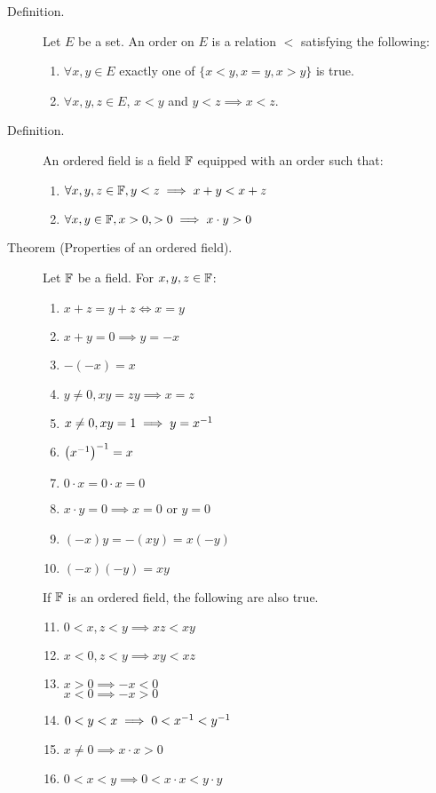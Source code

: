 \documentclass[letterpaper,11pt]{article}
\begin{document}
\begin{description}
\item[Definition.] Let $E$ be a set. An order on $E$ is a relation
    $<$ satisfying the following:
    \begin{enumerate}[(1)]
    \item $\forall x,y\in E$ exactly one of $\{x<y,x=y,x>y\}$ is true.
    \item $\forall x,y,z\in E$, $x<y$ and $y<z \implies x<z$.
    \end{enumerate}

\item[Definition.] An ordered field is a field $\mathbb{F}$ equipped with an
    order such that:
    \begin{enumerate}[(1)]
    \item $\forall x,y,z\in\mathbb{F}, y<z\implies x+y<x+z$
    \item $\forall x,y\in\mathbb{F}, x>0,>0\implies x\cdot y>0$
    \end{enumerate}

\item[Theorem (Properties of an ordered field).] Let $\mathbb{F}$ be a field.
    For $x,y,z\in\mathbb{F}$:
    \begin{multicols}{2}
    \begin{enumerate}[(F1)]
    \item $x+z=y+z\iff x=y$
    \item $x+y=0\implies y=-x$
    \item $-(-x)=x$
    \item $y\ne0,xy=zy\implies x=z$
    \item $x\ne0,xy=1\implies y={x^{-1}}$
    \item ${\left({x^{-1}}\right)^{-1}}=x$
    \item $0\cdot x=0\cdot x=0$
    \item $x\cdot y=0\implies x=0$ or $y=0$
    \item $(-x)y=-(xy)=x(-y)$
    \item $(-x)(-y)=xy$
    \end{enumerate}
    \end{multicols}
    If $\mathbb{F}$ is an ordered field, the following are also true.
    \begin{multicols}{2}
    \begin{enumerate}[(F1)]
    \setcounter{enumi}{10}
    \item $0<x,z<y\implies xz<xy$
    \item $x<0,z<y\implies xy<xz$
    \item $x>0\implies -x<0$\\$x<0\implies -x>0$
    \item $0<y<x\implies 0<{x^{-1}}<{y^{-1}}$
    \item $x\ne0\implies x\cdot x>0$
    \item $0<x<y\implies 0<x\cdot x<y\cdot y$\\\text{}
    \end{enumerate}
    \end{multicols}


\end{description}
\end{document}
